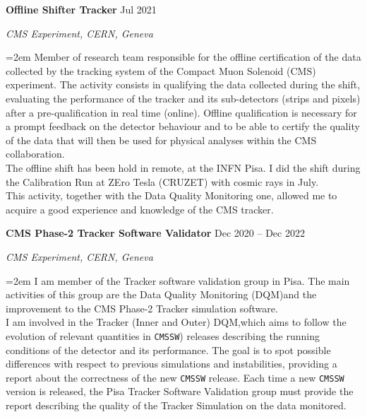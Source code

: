 \documentclass[paper=a4,fontsize=12pt]{article} %
\newcommand{\sepspace}{\vspace*{1em}}		%
\newcommand{\EducationEntry}[4]{
	\noindent \textbf{#1} \hfill      %
	{#2} \par  %
	\noindent \textit{#3} \par        %
	\noindent\hangindent=2em\hangafter=0 \small #4 %
	\normalsize \par}
\begin{document}
	\sepspace 
	\EducationEntry{Offline Shifter Tracker}{Jul 2021}{CMS Experiment, CERN, Geneva}{Member of research team responsible for the offline certification of the data collected by the tracking system of the Compact Muon Solenoid (CMS) experiment. The activity consists in qualifying the data collected during the shift, evaluating the performance of the tracker and its sub-detectors (strips and pixels) after a pre-qualification in real time (online). Offline qualification is necessary for a prompt feedback on the detector behaviour and to be able to certify the quality of the data that will then be used for physical analyses within the CMS collaboration.\\ The offline shift has been hold in remote, at the INFN Pisa. I did the shift during the Calibration Run at ZEro Tesla (CRUZET) with cosmic rays in July. \\This activity, together with the Data Quality Monitoring one, allowed me to acquire a good experience and knowledge of the CMS tracker.} 
	 \sepspace
    \EducationEntry{CMS Phase-2 Tracker Software Validator}{Dec 2020 -- Dec 2022}{CMS Experiment, CERN, Geneva}{I am member of the Tracker software validation group in Pisa. The main activities of this group are the Data Quality Monitoring (DQM)and the improvement to the CMS Phase-2 Tracker simulation software.\\ I am involved in the Tracker (Inner and Outer) DQM,which aims to follow the evolution of relevant quantities in \texttt{CMSSW}) releases describing the running conditions of the detector and its performance. The goal is to spot possible differences with respect to previous simulations and instabilities, providing a report about the correctness of the new \texttt{CMSSW} release. Each time a new \texttt{CMSSW} version is released, the Pisa Tracker Software Validation group must provide the report describing the quality of the Tracker Simulation on the data monitored.}
    \sepspace
\end{document}
